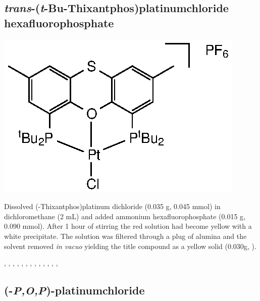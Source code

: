 \subsection*{\emph{trans}-(\emph{t}-Bu-Thixantphos)platinumchloride hexafluorophosphate}
\begin{structure}[h]
\begin{center}
\includegraphics{../Structures/StBuPtClPF6.eps}
\end{center}
\end{structure}

Dissolved (\tBu-Thixantphos)platinum dichloride (0.035 g, 0.045 mmol) in dichloromethane (2 mL) and added ammonium hexafluorophosphate (0.015 g, 0.090 mmol).  After 1 hour of stirring the red solution had become yellow with a white precipitate.  The solution was filtered through a plug of alumina and the solvent removed \emph{in vacuo} yielding the title compound as a yellow solid (0.030g, \fixme{\%}).  

,
,
,
,
,
,
,
,
,
,
,
,
,


\subsection*{(\tBuXantphosk-\emph{P,O,P})-platinumchloride}


